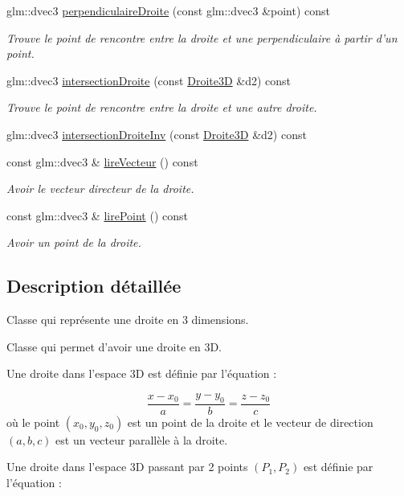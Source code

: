 \begin{DoxyCompactItemize}
glm\-::dvec3 \hyperlink{classmath_1_1_droite3_d_a3f7c51ac488d9a1fe332c3d295a310b8}{perpendiculaire\-Droite} (const glm\-::dvec3 \&point) const 
\begin{DoxyCompactList}\small\item\em Trouve le point de rencontre entre la droite et une perpendiculaire à partir d'un point. \end{DoxyCompactList}\item 
glm\-::dvec3 \hyperlink{classmath_1_1_droite3_d_a2bb803e7f53773555e90e47f04913d68}{intersection\-Droite} (const \hyperlink{classmath_1_1_droite3_d}{Droite3\-D} \&d2) const 
\begin{DoxyCompactList}\small\item\em Trouve le point de rencontre entre la droite et une autre droite. \end{DoxyCompactList}\item 
glm\-::dvec3 \hyperlink{classmath_1_1_droite3_d_a160fcf773c702ece0a2ca45e3d64d08c}{intersection\-Droite\-Inv} (const \hyperlink{classmath_1_1_droite3_d}{Droite3\-D} \&d2) const 
\item 
const glm\-::dvec3 \& \hyperlink{classmath_1_1_droite3_d_a903f20fd767699e95f747b4722e8aa04}{lire\-Vecteur} () const 
\begin{DoxyCompactList}\small\item\em Avoir le vecteur directeur de la droite. \end{DoxyCompactList}\item 
const glm\-::dvec3 \& \hyperlink{classmath_1_1_droite3_d_a5de95860b960b37e4c55f857f020c652}{lire\-Point} () const 
\begin{DoxyCompactList}\small\item\em Avoir un point de la droite. \end{DoxyCompactList}\end{DoxyCompactItemize}


\subsection{Description détaillée}
Classe qui représente une droite en 3 dimensions. 

Classe qui permet d'avoir une droite en 3\-D. \par
Une droite dans l'espace 3\-D est définie par l'équation \-:

\[ \frac {x - x_0 } {a} = \frac { y - y_0 } {b} = \frac { z - z_0 } {c} \] où le point $ (x_0, y_0, z_0) $ est un point de la droite et le vecteur de direction $ (a, b, c) $ est un vecteur parallèle à la droite.\par
 \par
Une droite dans l'espace 3\-D passant par 2 points $ ( P_1, P_2) $ est définie par l'équation \-:

